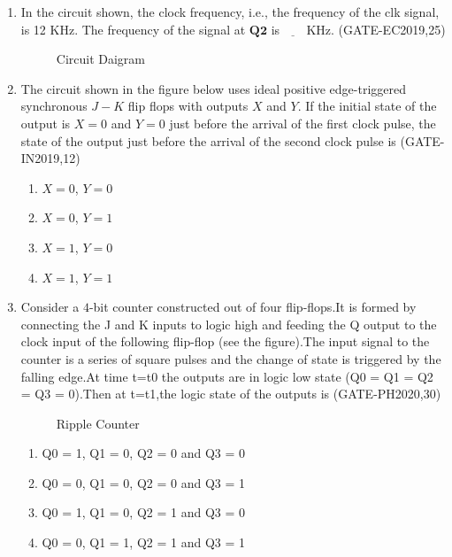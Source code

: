 \begin{enumerate}
\item In the circuit shown, the clock frequency, i.e., the frequency of the clk signal, is 12 KHz. The frequency of the signal at $\mathbf{Q2}$ is $\underline{\hspace{18pt}}$ KHz.
		\hfill(GATE-EC2019,25)
		\begin{figure}[H]
			
			\caption{Circuit Daigram}
		\end{figure}

 \item The circuit shown in the figure below uses ideal positive edge-triggered synchronous $J-K$ flip flops with outputs $X$ and $Y$. If the initial state of the output is $X=0$ and $Y=0$ just before the arrival of the first clock pulse, the state of the output just before the arrival of the second clock pulse is
              \hfill(GATE-IN2019,12)
\begin{figure}[H]
    \centering
    
   

\end{figure}
\begin{enumerate}
    \item $X=0$, $Y=0$
    \item $X=0$, $Y=1$
    \item $X=1$, $Y=0$
    \item$X=1$, $Y=1$
\end{enumerate}

\item Consider a $4$-bit counter constructed out of four flip-flops.It is formed by connecting the J and K inputs to logic high and feeding the Q output to the clock input of the following flip-flop (see the figure).The input signal to the counter is a series of square pulses and the change of state is triggered by the falling edge.At time t=t0 the outputs are in logic low state (Q0 = Q1 = Q2 = Q3 = 0).Then at t=t1,the logic state of the outputs is 
		               \hfill(GATE-PH2020,30)
\begin{figure}[H]
    \centering

    \caption{Ripple Counter}
   
    \end{figure}
\begin{enumerate}
\item  Q0 = 1, Q1 = 0, Q2 = 0 and Q3 = 0 
\item  Q0 = 0, Q1 = 0, Q2 = 0 and Q3 = 1
\item  Q0 = 1, Q1 = 0, Q2 = 1 and Q3 = 0
\item  Q0 = 0, Q1 = 1, Q2 = 1 and Q3 = 1
\end{enumerate}





\end{enumerate}
